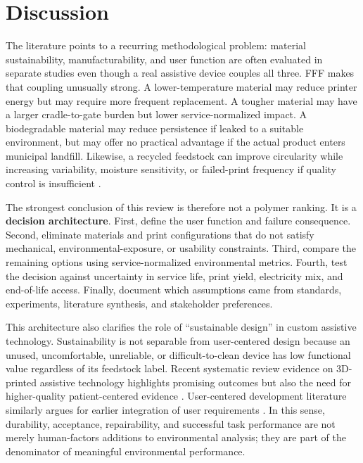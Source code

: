 \documentclass[11pt]{article}
\begin{document}
\section{Discussion}

The literature points to a recurring methodological problem: material sustainability, manufacturability, and user function are often evaluated in separate studies even though a real assistive device couples all three. FFF makes that coupling unusually strong. A lower-temperature material may reduce printer energy but may require more frequent replacement. A tougher material may have a larger cradle-to-gate burden but lower service-normalized impact. A biodegradable material may reduce persistence if leaked to a suitable environment, but may offer no practical advantage if the actual product enters municipal landfill. Likewise, a recycled feedstock can improve circularity while increasing variability, moisture sensitivity, or failed-print frequency if quality control is insufficient \cite{sola2024,zander2018}.

The strongest conclusion of this review is therefore not a polymer ranking. It is a \textbf{decision architecture}. First, define the user function and failure consequence. Second, eliminate materials and print configurations that do not satisfy mechanical, environmental-exposure, or usability constraints. Third, compare the remaining options using service-normalized environmental metrics. Fourth, test the decision against uncertainty in service life, print yield, electricity mix, and end-of-life access. Finally, document which assumptions came from standards, experiments, literature synthesis, and stakeholder preferences.

This architecture also clarifies the role of ``sustainable design'' in custom assistive technology. Sustainability is not separable from user-centered design because an unused, uncomfortable, unreliable, or difficult-to-clean device has low functional value regardless of its feedstock label. Recent systematic review evidence on 3D-printed assistive technology highlights promising outcomes but also the need for higher-quality patient-centered evidence \cite{rasmussen2026}. User-centered development literature similarly argues for earlier integration of user requirements \cite{coelho2026}. In this sense, durability, acceptance, repairability, and successful task performance are not merely human-factors additions to environmental analysis; they are part of the denominator of meaningful environmental performance.
\end{document}

